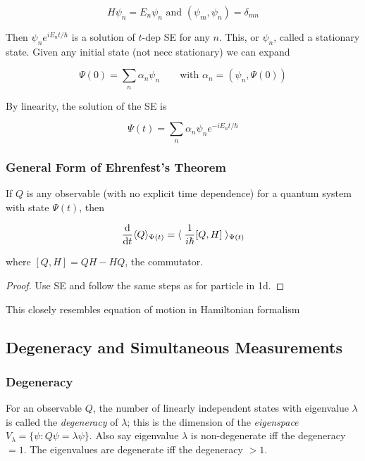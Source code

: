 \documentclass[a4paper]{article}
\begin{document}
\begin{eg}
\begin{enumerate}
		\[ H \psi_{n} = E_{n} \psi_{n} \text{ and } (\psi_{m},\psi_{n}) = \delta_{mn}  \]
		
		Then $ \psi_{n}e^{i E_{n} t / \hbar } $ is a solution of $ t $-dep SE for any $ n $. This, or $ \psi_{n} $, called a stationary state. Given any initial state (not necc stationary) we can expand 
		
		\[ \Psi(0) = \sum_{n} \alpha_{n} \psi_{n}  \qquad \text{with } \alpha_{n} = ( \psi_{n}, \Psi(0) ) \]
		
		By linearity, the solution of the SE is 
		
		\[ \Psi(t) = \sum_{n} \alpha_{n} \psi_{n} e^{-i E_{n} t / \hbar  } \]
		
		
		\subsubsection{General Form of Ehrenfest's Theorem}
		
		If $ Q $ is any observable (with no explicit time dependence) for a quantum system with state $ \Psi(t) $, then 
		
		\[ \frac{\mathrm{d} }{\mathrm{d} t} \langle Q \rangle_{\Psi(t)} =  \langle \; \frac{1}{i \hbar}[Q,H]  \; \rangle_{\Psi(t)}  \]  
		
		where $ [Q,H]  = QH - HQ $, the commutator.
		
		\begin{proof}
			Use SE and follow the same steps as for particle in 1d.
		\end{proof}
		
		This closely resembles equation of motion in Hamiltonian formalism
		
	\end{enumerate}
\end{eg}

\subsection{Degeneracy and Simultaneous Measurements}

\subsubsection{Degeneracy}

For an observable $ Q $, the number of linearly independent states with eigenvalue $ \lambda $ is called the \emph{degeneracy} of $ \lambda $; this is the dimension of the \emph{eigenspace} $ V_{\lambda} = \{  \psi : Q \psi = \lambda \psi \} $. Also say eigenvalue $ \lambda $ is non-degenerate iff the degeneracy $ = 1 $. The eigenvalues are degenerate iff the degeneracy $ > 1 $. 
\end{document}
